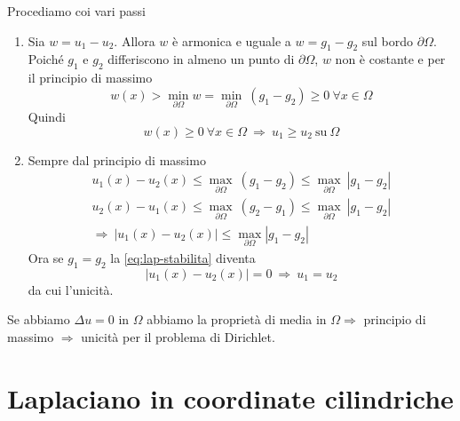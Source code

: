 \begin{dimostrazione}
    Procediamo coi vari passi
    \begin{enumerate}
        \item Sia $w=u_{1} -u_{2}$. Allora $w$ è armonica e uguale a $w=g_{1}-g_{2}$ sul bordo $\partial \Omega$. Poiché $g_{1}$ e $g_{2}$ differiscono in almeno un punto di $\partial \Omega $, $w$ non è costante e per il principio di massimo
              \begin{equation*}
                  w(x)  >\min_{\partial \Omega } w =\min_{\partial \Omega } \ (g_{1} -g_{2}) \geqslant 0\ \forall x\in \Omega
              \end{equation*}
              Quindi
              \begin{equation*}
                  w(x) \geqslant 0\ \forall x\in \Omega \ \Rightarrow \ u_{1} \geqslant u_{2} \ \mathrm{su} \ \Omega
              \end{equation*}
        \item Sempre dal principio di massimo
              \begin{gather*}
                  u_{1}(x) -u_{2}(x) \leqslant \max_{\partial \Omega } \ (g_{1} -g_{2}) \leqslant \max_{\partial \Omega } \ | g_{1} -g_{2}| \\
                  u_{2}(x) -u_{1}(x) \leqslant \max_{\partial \Omega } \ (g_{2} -g_{1}) \leqslant \max_{\partial \Omega } \ | g_{1} -g_{2}| \\
                  \Rightarrow \ | u_{1}(x) -u_{2}(x)| \leqslant \max_{\partial \Omega }| g_{1} -g_{2}|
              \end{gather*}
              Ora se $\displaystyle g_{1} =g_{2}$ la \eqref{eq:lap-stabilita} diventa
              \begin{equation*}
                  | u_{1}(x) -u_{2}(x)| =0\ \Rightarrow \ u_{1} =u_{2}
              \end{equation*}
              da cui l'unicità.
    \end{enumerate}
\end{dimostrazione}

Se abbiamo $\Delta u=0$ in $\Omega $ abbiamo la proprietà di media in $\Omega \Rightarrow $ principio di massimo $\Rightarrow $ unicità per il problema di Dirichlet.
\section{Laplaciano in coordinate cilindriche}


